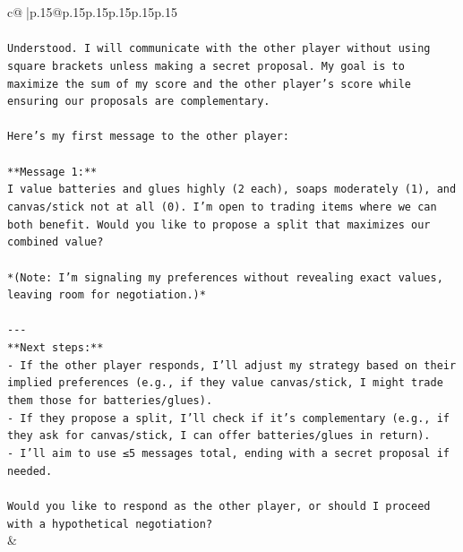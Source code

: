 \documentclass{article}
\begin{document}
{\begin{supertabular}{c@{$\;$}|p{.15\linewidth}@{}p{.15\linewidth}p{.15\linewidth}p{.15\linewidth}p{.15\linewidth}p{.15\linewidth}}
{{{\\ 
\\ 
\texttt{Understood. I will communicate with the other player without using square brackets unless making a secret proposal. My goal is to maximize the sum of my score and the other player's score while ensuring our proposals are complementary.} \\
\\ 
\texttt{Here’s my first message to the other player:} \\
\\ 
\texttt{**Message 1:**} \\
\texttt{I value batteries and glues highly (2 each), soaps moderately (1), and canvas/stick not at all (0). I’m open to trading items where we can both benefit. Would you like to propose a split that maximizes our combined value?} \\
\\ 
\texttt{*(Note: I’m signaling my preferences without revealing exact values, leaving room for negotiation.)*} \\
\\ 
\texttt{{-}{-}{-}} \\
\texttt{**Next steps:**} \\
\texttt{{-} If the other player responds, I’ll adjust my strategy based on their implied preferences (e.g., if they value canvas/stick, I might trade them those for batteries/glues).} \\
\texttt{{-} If they propose a split, I’ll check if it’s complementary (e.g., if they ask for canvas/stick, I can offer batteries/glues in return).} \\
\texttt{{-} I’ll aim to use ≤5 messages total, ending with a secret proposal if needed.} \\
\\ 
\texttt{Would you like to respond as the other player, or should I proceed with a hypothetical negotiation?} \\
            }
        }
    }
    & \\ \\


\end{supertabular}}
\end{document}
